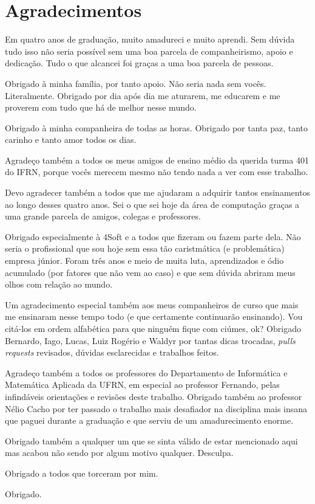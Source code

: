 
\chapter*{Agradecimentos}

Em quatro anos de graduação, muito amadureci e muito aprendi. Sem dúvida tudo isso não seria possível sem uma boa parcela de companheirismo, apoio e dedicação. Tudo o que alcancei foi graças a uma boa parcela de pessoas.

Obrigado à minha família, por tanto apoio. Não seria nada sem vocês. Literalmente. Obrigado por dia após dia me aturarem, me educarem e me proverem com tudo que há de melhor nesse mundo.

Obrigado à minha companheira de todas as horas. Obrigado por tanta paz, tanto carinho e tanto amor todos os dias.

Agradeço também a todos os meus amigos de ensino médio da querida turma 401 do IFRN, porque vocês merecem mesmo não tendo nada a ver com esse trabalho.

Devo agradecer também a todos que me ajudaram a adquirir tantos ensinamentos ao longo desses quatro anos. Sei o que sei hoje da área de computação graças a uma grande parcela de amigos, colegas e professores.

Obrigado especialmente à 4Soft e a todos que fizeram ou fazem parte dela. Não seria o profissional que sou hoje sem essa tão caristmática (e problemática) empresa júnior. Foram três anos e meio de muita luta, aprendizados e ódio acumulado (por fatores que não vem ao caso) e que sem dúvida abriram meus olhos com relação ao mundo.

Um agradecimento especial também aos meus companheiros de curso que mais me ensinaram nesse tempo todo (e que certamente continuarão ensinando). Vou citá-los em ordem alfabética para que ninguém fique com ciúmes, ok? Obrigado Bernardo, Iago, Lucas, Luiz Rogério e Waldyr por tantas dicas trocadas, \textit{pulls requests} revisados, dúvidas esclarecidas e trabalhos feitos.

Agradeço também a todos os professores do Departamento de Informática e Matemática Aplicada da UFRN, em especial ao professor Fernando, pelas infindáveis orientações e revisões deste trabalho. Obrigado também ao professor Nélio Cacho por ter passado o trabalho mais desafiador na disciplina mais insana que paguei durante a graduação e que serviu de um amadurecimento enorme.

Obrigado também a qualquer um que se sinta válido de estar mencionado aqui mas acabou não sendo por algum motivo qualquer. Desculpa.

Obrigado a todos que torceram por mim.

Obrigado.
